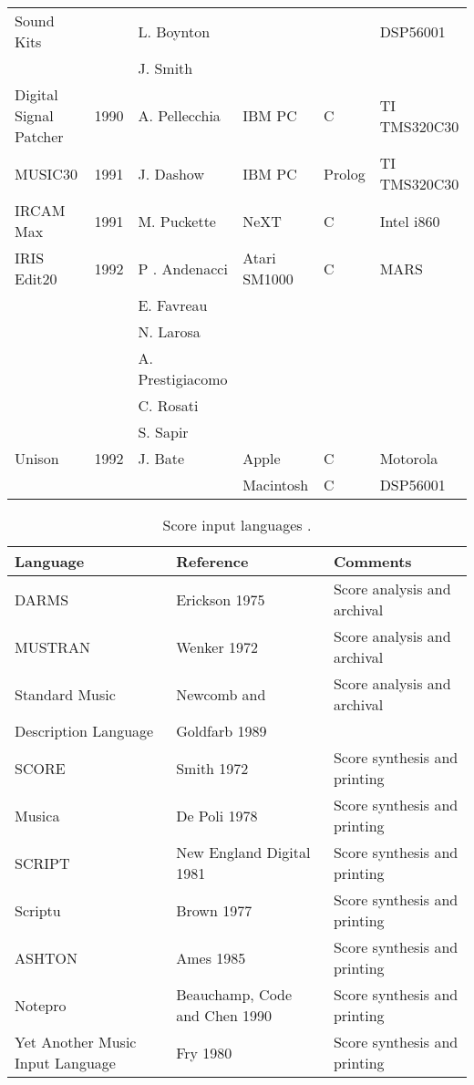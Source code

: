 \begin{table}[htbp]
\begin{tabular}{ *{6}{l} }
		Sound Kits & & L. Boynton & & & DSP56001 \\
		& & J. Smith & & & \\
		Digital Signal Patcher & 1990 & A. Pellecchia & IBM PC & C & TI TMS320C30 \\
		MUSIC30 & 1991 & J. Dashow & IBM PC & Prolog & TI TMS320C30 \\
		IRCAM Max & 1991 & M. Puckette & NeXT & C & Intel i860 \\
		IRIS Edit20 & 1992 & P . Andenacci & Atari SM1000 & C & MARS \\
		& & E. Favreau & & & \\
		& & N. Larosa & & & \\
		& & A. Prestigiacomo & & & \\
		& & C. Rosati & & & \\
		& & S. Sapir & & & \\
		Unison & 1992 & J. Bate & Apple & C & Motorola \\
		& & & Macintosh & C & DSP56001 \\
		\hline
	\end{tabular}
\end{table}

\begin{table}[htbp]
	\label{tab:score}
	\caption{Score input languages \cite[811]{Roads1995}.}
	\centering
	\vspace{12pt}
	\begin{tabular}{ *{3}{l} }
		\hline
		Language & Reference & Comments \\
		\hline
		DARMS & Erickson 1975 & Score analysis and archival \\
		MUSTRAN & Wenker 1972 & Score analysis and archival \\
		Standard Music & Newcomb and & Score analysis and archival \\
		Description Language & Goldfarb 1989 & \\
		SCORE & Smith 1972 & Score synthesis and printing \\
		Musica & De Poli 1978 & Score synthesis and printing \\
		SCRIPT & New England Digital 1981 & Score synthesis and printing \\
		Scriptu & Brown 1977 & Score synthesis and printing \\
		ASHTON & Ames 1985 & Score synthesis and printing \\
		Notepro & Beauchamp, Code and Chen 1990 & Score synthesis and printing \\
		Yet Another Music Input Language & Fry 1980 & Score synthesis and printing \\
		\hline
	\end{tabular}
\end{table}


